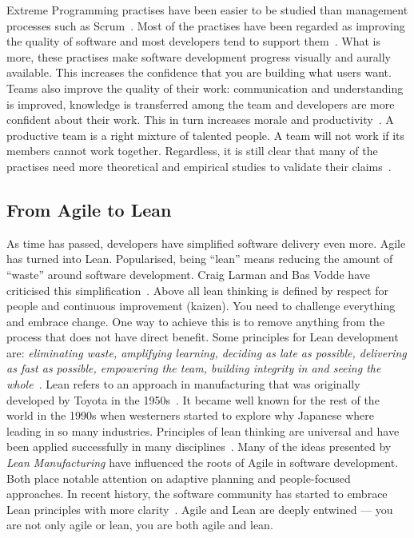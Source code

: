 \documentclass[english]{tktltiki2}
\begin{document}
Extreme Programming practises have been easier to be studied than management processes such as Scrum~\cite{DD08, DNB12, KRM13}. Most of the practises have been regarded as improving the quality of software and most developers tend to support them~\cite{DD08, SS10}. What is more, these practises make software development progress visually and aurally available. This increases the confidence that you are building what users want. Teams also improve the quality of their work: communication and understanding is improved, knowledge is transferred among the team and developers are more confident about their work. This in turn increases morale and productivity~\cite{SS10, LTR14}. A productive team is a right mixture of talented people. A team will not work if its members cannot work together. Regardless, it is still clear that many of the practises need more theoretical and empirical studies to validate their claims~\cite{DD08}.

\subsection{From Agile to Lean}

As time has passed, developers have simplified software delivery even more. Agile has turned into Lean. Popularised, being “lean” means reducing the amount of “waste” around software development. Craig Larman and Bas Vodde have criticised this simplification~\cite{LV09}. Above all lean thinking is defined by respect for people and continuous improvement (kaizen). You need to challenge everything and embrace change. One way to achieve this is to remove anything from the process that does not have direct benefit. Some principles for Lean development are: \emph{eliminating waste, amplifying learning, deciding as late as possible, delivering as fast as possible, empowering the team, building integrity in and seeing the whole}~\cite{PP03}. Lean refers to an approach in manufacturing that was originally developed by Toyota in the 1950s~\cite{Fow08}. It became well known for the rest of the world in the 1990s when westerners started to explore why Japanese where leading in so many industries. Principles of lean thinking are universal and have been applied successfully in many disciplines~\cite{Pop02}. Many of the ideas presented by \emph{Lean Manufacturing} have influenced the roots of Agile in software development. Both place notable attention on adaptive planning and people-focused approaches. In recent history, the software community has started to embrace Lean principles with more clarity~\cite{Fow08}. Agile and Lean are deeply entwined — you are not only agile or lean, you are both agile and lean.
\end{document}
